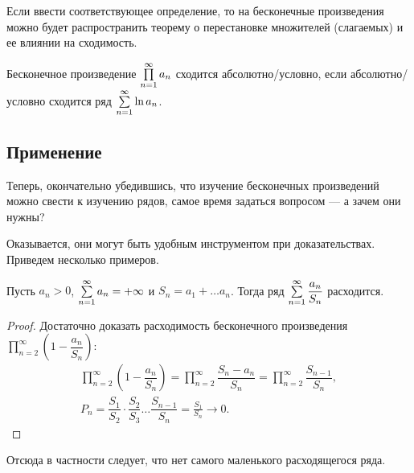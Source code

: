 Если ввести соответствующее определение, то на бесконечные произведения можно будет распространить теорему о перестановке множителей (слагаемых) и ее влиянии на сходимость.

\begin{Def}
Бесконечное произведение $\prod\limits_{n=1}^{\infty} a_n$ сходится абсолютно/условно, если абсолютно/условно сходится ряд $\sum\limits_{n=1}^{\infty}\ln a_n$.
\end{Def}

\subsection{Применение}
Теперь, окончательно убедившись, что изучение бесконечных произведений можно свести к изучению рядов, самое время задаться вопросом --- а зачем они нужны?

Оказывается, они могут быть удобным инструментом при доказательствах. Приведем несколько примеров.
\begin{Statement}
Пусть $a_n > 0$, $\sum\limits_{n=1}^{\infty}a_n = +\infty$ и $S_n = a_1 + \ldots a_n$. Тогда ряд $\sum\limits_{n=1}^{\infty}\dfrac{a_n}{S_n}$ расходится.
\end{Statement}
\begin{proof}
Достаточно доказать расходимость бесконечного произведения $\prod\limits_{n=2}^{\infty} \left( 1 - \dfrac{a_n}{S_n}\right)$:
\begin{gather*}
\prod\limits_{n=2}^{\infty}\left(1 - \dfrac{a_n}{S_n} \right) = \prod\limits_{n=2}^{\infty} \dfrac{S_n - a_n}{S_n} = \prod\limits_{n=2}^{\infty} \dfrac{S_{n-1}}{S_n}, \\
P_n = \dfrac{S_1}{S_2}\cdot \dfrac{S_2}{S_3} \ldots \dfrac{S_{n-1}}{S_n} = \frac{S_1}{S_n} \to 0.
\end{gather*}
\end{proof}

Отсюда в частности следует, что нет самого маленького расходящегося ряда.


